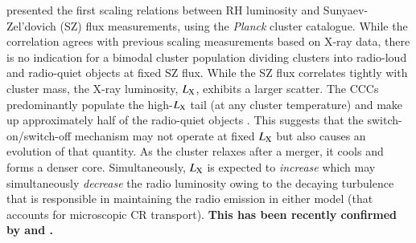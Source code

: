 \documentclass[useAMS,usenatbib]{mn2e}
\begin{document}
\cite{2012MNRAS.421L.112B} presented the first scaling relations
between RH luminosity and Sunyaev-Zel'dovich (SZ) flux measurements, using the
\emph{Planck} cluster catalogue. While the correlation agrees with previous
scaling measurements based on X-ray data, there is no indication for a bimodal
cluster population dividing clusters into radio-loud and radio-quiet objects at
fixed SZ flux. While the SZ flux correlates tightly with cluster mass, the X-ray
luminosity, $L_{\mathrm{X}}$, exhibits a larger scatter. The CCCs predominantly
populate the high-$L_{\mathrm{X}}$ tail (at any cluster temperature) and make up
approximately half of the radio-quiet objects \citep{2011A&A...527A..99E}. This
suggests that the switch-on/switch-off mechanism may not operate at fixed
$L_{\mathrm{X}}$ but also causes an evolution of that quantity. As the cluster
relaxes after a merger, it cools and forms a denser core. Simultaneously,
$L_{\mathrm{X}}$ is expected to {\em increase} which may simultaneously {\em
  decrease} the radio luminosity owing to the decaying turbulence that is
responsible in maintaining the radio emission in either model (that accounts for
microscopic CR transport). {\bf This has been recently confirmed by 
\cite{2013arXiv1307.3049S} and \cite{2013arXiv1306.4379C}.}
 
\end{document}
